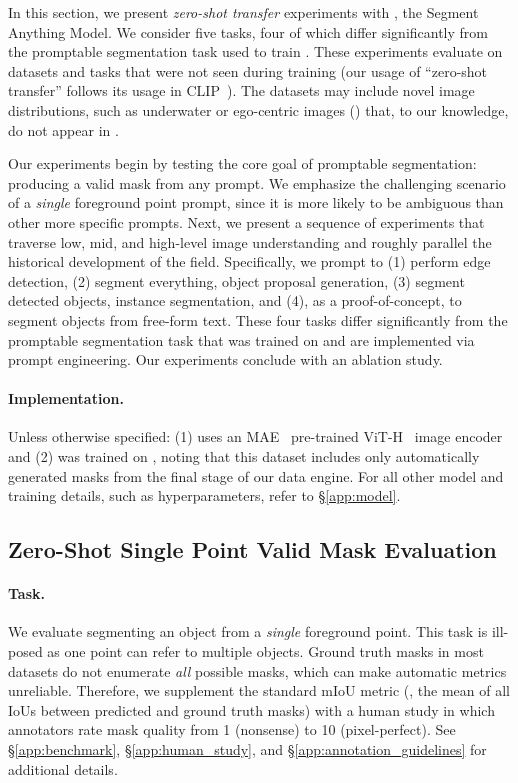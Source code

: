In this section, we present \emph{zero-shot transfer} experiments with \sam, the Segment Anything Model. We consider five tasks, four of which differ significantly from the promptable segmentation task used to train \sam. These experiments evaluate \sam on datasets and tasks that were not seen during training (our usage of ``zero-shot transfer'' follows its usage in CLIP~\cite{Radford2021}). The datasets may include novel image distributions, such as underwater or ego-centric images (\eg {}) that, to our knowledge, do not appear in \sad.

Our experiments begin by testing the core goal of promptable segmentation: producing a valid mask from any prompt. We emphasize the challenging scenario of a \emph{single} foreground point prompt, since it is more likely to be ambiguous than other more specific prompts. Next, we present a sequence of experiments that traverse low, mid, and high-level image understanding and roughly parallel the historical development of the field. Specifically, we prompt \sam to (1) perform edge detection, (2) segment everything, \ie object proposal generation, (3) segment detected objects, \ie instance segmentation, and (4), as a proof-of-concept, to segment objects from free-form text. These four tasks differ significantly from the promptable segmentation task that \sam was trained on and are implemented via prompt engineering. Our experiments conclude with an ablation study.

\paragraph{Implementation.} Unless otherwise specified: (1) \sam uses an MAE~\cite{he2022masked} pre-trained ViT-H~\cite{Dosovitskiy2021} image encoder and (2) \sam was trained on \sad, noting that this dataset includes only automatically generated masks from the final stage of our data engine. For all other model and training details, such as hyperparameters, refer to \S\ref{app:model}.

\subsection{Zero-Shot Single Point Valid Mask Evaluation}\label{sec:eval:single_point}\vspace{-2mm}

\paragraph{Task.} We evaluate segmenting an object from a \emph{single} foreground point. This task is ill-posed as one point can refer to multiple objects. Ground truth masks in most datasets do not enumerate \emph{all} possible masks, which can make automatic metrics unreliable. Therefore, we supplement the standard mIoU metric (\ie, the mean of all IoUs between predicted and ground truth masks) with a human study in which annotators rate mask quality from 1 (nonsense) to 10 (pixel-perfect). See \S\ref{app:benchmark}, \S\ref{app:human_study}, and \S\ref{app:annotation_guidelines} for additional details.

